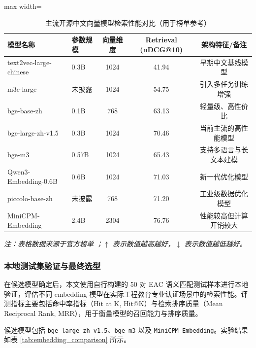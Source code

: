 \documentclass[UTF8,a4paper,zihao=-4]{ctexart}
\newcommand{\thesistablenote}[1]{\vspace{0.5ex}\par\raggedright\small\textit{注：#1}}
\begin{document}
\begin{table}[htbp]
\centering
\caption{主流开源中文向量模型检索性能对比（用于榜单参考）}
\label{tab:embedding_models}

{\small
\renewcommand{\arraystretch}{1.2}
\begin{adjustbox}{max width=\textwidth}
\begin{tabular}{llccc}
\toprule
\textbf{模型名称} & \textbf{参数规模} & \textbf{向量维度} & \textbf{Retrieval (nDCG@10)} & \textbf{架构特征/备注} \\
\midrule
text2vec-large-chinese & 0.3B & 1024 & 41.94 & 早期中文基线模型 \\
m3e-large & 未披露 & 1024 & 54.75 & 引入多任务训练增强 \\
bge-base-zh & 0.1B & 768 & 63.13 & 轻量级、高性价比 \\
bge-large-zh-v1.5 & 0.3B & 1024 & 70.46 & 当前主流的高性能模型 \\
bge-m3 & 0.57B & 1024 & 65.43 & 支持多语言与长文本建模 \\
Qwen3-Embedding-0.6B & 0.6B & 1024 & 71.03 & 新一代优化模型 \\
piccolo-base-zh & 未披露 & 768 & 71.20 & 工业级数据优化模型 \\
MiniCPM-Embedding & 2.4B & 2304 & 76.76 & 性能较高但计算开销较大 \\
\bottomrule
\end{tabular}
\end{adjustbox}
}
\thesistablenote{表格数据来源于官方榜单 \cite{c-mteb}；$\uparrow$ 表示数值越高越好，$\downarrow$ 表示数值越低越好。}


\end{table}

\subsubsection{本地测试集验证与最终选型}

在候选模型确定后，本文使用自行构建的 50 对 EAC 语义匹配测试样本进行本地验证，评估不同 embedding 模型在实际工程教育专业认证场景中的检索性能。评测指标主要包括命中率指标（Hit at K, Hit@K）与检索排序质量（Mean Reciprocal Rank, MRR），用于衡量模型的召回能力与排序质量。

候选模型包括 \texttt{bge-large-zh-v1.5}、\texttt{bge-m3} 以及 \texttt{MiniCPM-Embedding}。实验结果如表 \ref{tab:embedding_comparison} 所示。
\end{document}
